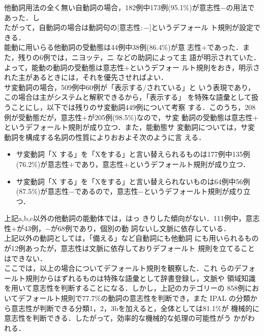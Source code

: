 {他動詞用法の全く無い自動詞の場合，\hspace{-0.3mm}182例中173例(95.1\%)が意志性$-$の用法で
あった．\hspace{-0.3mm}し\\たがって，自動詞の場合は動詞句の$[$意志性$:-]$というデフォール
ト規則が設定できる．\\
能動に用いらる他動詞\cite{IPAL}の受動態は44例中38例(86.4\%)が意
志性$+$であった．また，残りの6例では，ニヨッテ，ニ などの助詞によって{\dg 主}
語が明示されていた．よって，能動の動詞の受動態は意志性$+$というデフォー
ルト規則をおき，明示された{\dg 主}があるときには，それを優先させればよい．\\
サ変動詞の場合，509例中60例が「表示する/されている」と
いう表現であり，この場合は{\dg 主}がシステムと解釈できるから，「表示する」
を特殊な語彙として扱うことにし，以下では残りのサ変動詞449例について考察
する．このうち，208例が受動態だが，意志性$+$が205例(98.5\%)なので，サ変
動詞の受動態は意志性$+$というデフォールト規則が成り立つ．また，能動態サ
変動詞については，サ変動詞を構成する名詞の性質によりおおよそ次のように言
える．
\begin{itemize}
\item 
サ変動詞「X する」を「Xをする」と言い替えられるものは177例中135例
(76.2\%)が意志性$+$であり，意志性$+$というデフォールト規則が成り立つ．
\item 
サ変動詞「X する」を「Xをする」と言い替えられないものは64例中56例
(87.5\%)が意志性$-$であるので，意志性$-$というデフォールト規則が成り立つ．
\end{itemize}

上記a,b,c以外の他動詞の能動体では，はっ
きりした傾向がない．111例中，意志性$+$が43例，$-$が68例であり，個別の動
詞ないし文脈に依存している．\\
上記以外の動詞としては，「備える」など自動詞にも他動詞
にも用いられるものが12例あったが，意志性は文脈に依存しておりデフォールト
規則を立てることはできない．\\

ここでは，以上の場合についてデフォールト規則を観察した．これ
らのデフォールト規則からはずれるものは特殊な語彙として辞書登録し，文脈や
領域知識を用いて意志性を判断することになる．しかし，上記のカテゴリーの
858例においてデフォールト規則で77.7\%の動詞の意志性を判断でき，また IPAL 
の分類から意志性が判断できる分類1，2，3bを加えると，全体としては81.1\%が
機械的に意志性を判断できる．したがって，効率的な機械的な処理の可能性がう
かがわれる．

}
